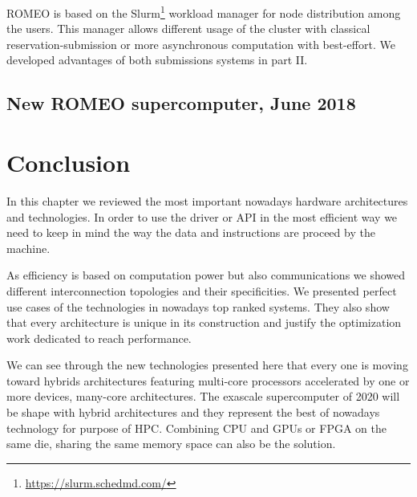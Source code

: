 ROMEO is based on the Slurm\footnote{\url{https://slurm.schedmd.com/}} workload manager for node distribution among the users. 
This manager allows different usage of the cluster with classical reservation-submission or more asynchronous computation with best-effort. 
We developed advantages of both submissions systems in part II. 

\subsection{New ROMEO supercomputer, June 2018}


\section{Conclusion}

In this chapter we reviewed the most important nowadays hardware architectures and technologies. 
In order to use the driver or API in the most efficient way we need to keep in mind the way the data and instructions are proceed by the machine. 

As efficiency is based on computation power but also communications we showed different interconnection topologies and their specificities. 
We presented perfect use cases of the technologies in nowadays top ranked systems.
They also show that every architecture is unique in its construction and justify the optimization work dedicated to reach performance. 

We can see through the new technologies presented here that every one is moving toward hybrids architectures featuring multi-core processors accelerated by one or more devices, many-core architectures. 
The exascale supercomputer of 2020 will be shape with hybrid architectures and they represent the best of nowadays technology for purpose of HPC. 
Combining CPU and GPUs or FPGA on the same die, sharing the same memory space can also be the solution.
